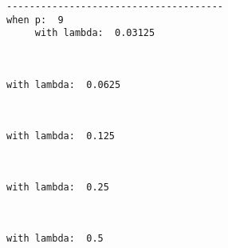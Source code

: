 \documentclass[11pt]{article}
\begin{document}
    \begin{Verbatim}[commandchars=\\\{\}]
--------------------------------------
when p:  9
     with lambda:  0.03125

    \end{Verbatim}

    \begin{center}
    \end{center}
    { \hspace*{\fill} \\}
    
    \begin{Verbatim}[commandchars=\\\{\}]
     with lambda:  0.0625

    \end{Verbatim}

    \begin{center}
    \end{center}
    { \hspace*{\fill} \\}
    
    \begin{Verbatim}[commandchars=\\\{\}]
     with lambda:  0.125

    \end{Verbatim}

    \begin{center}
    \end{center}
    { \hspace*{\fill} \\}
    
    \begin{Verbatim}[commandchars=\\\{\}]
     with lambda:  0.25

    \end{Verbatim}

    \begin{center}
    \end{center}
    { \hspace*{\fill} \\}
    
    \begin{Verbatim}[commandchars=\\\{\}]
     with lambda:  0.5

    \end{Verbatim}
\end{document}
